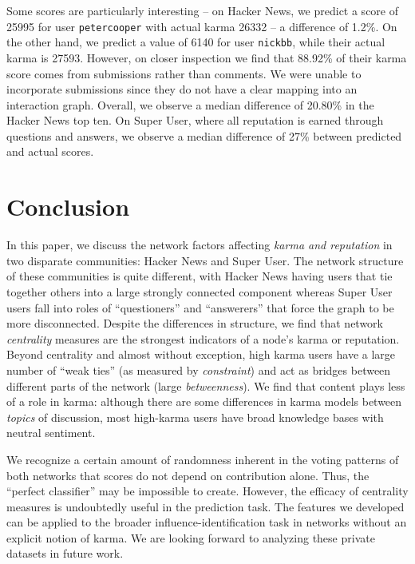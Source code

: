 \documentclass[11pt]{article}
\begin{document}
Some scores are particularly interesting -- on Hacker News, we
predict a score of 25995 for user \texttt{petercooper} with actual karma 26332 --
a difference of 1.2\%. On the other hand, we predict a value of 6140 for user
\texttt{nickbb}, while their actual karma is 27593. However, on closer inspection
we find that 88.92\% of their karma score comes from submissions rather than
comments. We were unable to incorporate submissions since they do not have
a clear mapping into an interaction graph. Overall, we observe a median difference of
20.80\% in the Hacker News top ten. On Super User, where all reputation is earned 
through questions and answers, we observe a median
difference of 27\% between predicted and actual scores.

\section{Conclusion}
\label{sec:conclusion}

In this paper, we discuss the network factors affecting \textit{karma and reputation}
in two disparate communities: Hacker News and
Super User. The network structure of these communities is quite different, with
Hacker News having users that tie together others into a large strongly
connected component whereas Super User users fall into roles of ``questioners''
and ``answerers'' that force the graph to be more disconnected. Despite the
differences in structure, we find that network \textit{centrality} measures are
the strongest indicators of a node's karma or reputation. Beyond centrality and
almost without exception, high karma users have a large number of ``weak ties''
(as measured by \textit{constraint}) and act as bridges between different parts
of the network (large \textit{betweenness}). We find that content plays less of a role
in karma: although there are some differences in karma models
between \textit{topics} of discussion, most high-karma users have broad
knowledge bases with neutral sentiment. 

We recognize a certain amount of randomness inherent in the voting patterns 
of both networks that scores do not depend on contribution alone. Thus, 
the ``perfect classifier'' may be  impossible to create. However, the efficacy 
of centrality measures  is undoubtedly useful in the prediction task. 
The features we developed can be applied to the broader influence-identification 
task in networks without an explicit notion of karma. We are looking forward
to analyzing these private datasets in future work.

{} 
\end{document}
